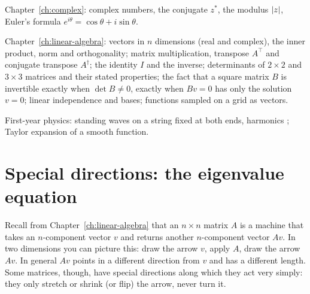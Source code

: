 \begin{prerequisites}
\item Chapter~\ref{ch:complex}: complex numbers, the conjugate $z^*$, the modulus $\left\lvert z\right\rvert$, Euler's formula $e^{i\theta}=\cos\theta+i\sin\theta$.
\item Chapter~\ref{ch:linear-algebra}: vectors in $n$ dimensions (real and complex), the inner product, norm and orthogonality; matrix multiplication, transpose $A^\top$ and conjugate transpose $A^\dagger$; the identity $I$ and the inverse; determinants of $2\times2$ and $3\times3$ matrices and their stated properties; the fact that a square matrix $B$ is invertible exactly when $\det B\ne0$, exactly when $Bv=0$ has only the solution $v=0$; linear independence and bases; functions sampled on a grid as vectors.
\item First-year physics: standing waves on a string fixed at both ends, harmonics \cite{hrw}; Taylor expansion of a smooth function.
\end{prerequisites}

\section{Special directions: the eigenvalue equation}\label{sec:eigen-equation}

Recall from Chapter~\ref{ch:linear-algebra} that an $n\times n$ matrix $A$ is a machine that takes an $n$-component vector $v$ and returns another $n$-component vector $Av$. In two dimensions you can picture this: draw the arrow $v$, apply $A$, draw the arrow $Av$. In general $Av$ points in a different direction from $v$ and has a different length. Some matrices, though, have special directions along which they act very simply: they only stretch or shrink (or flip) the arrow, never turn it.

